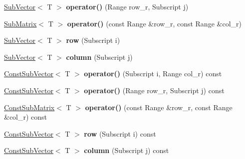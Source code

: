 \begin{DoxyCompactItemize}
\item 
\mbox{\label{classTLAS_1_1Matrix_ab6a9916b81266044063022812ecd8200}} 
\hyperlink{classTLAS_1_1SubVector}{Sub\+Vector}$<$ T $>$ {\bfseries operator()} (Range row\+\_\+r, Subscript j)
\item 
\mbox{\label{classTLAS_1_1Matrix_a30876c6a33cc3f94cf8ea70fa6d68004}} 
\hyperlink{classTLAS_1_1SubMatrix}{Sub\+Matrix}$<$ T $>$ {\bfseries operator()} (const Range \&row\+\_\+r, const Range \&col\+\_\+r)
\item 
\mbox{\label{classTLAS_1_1Matrix_a21a46bf3c6aefeed8a3bb9ffe2dc9c5f}} 
\hyperlink{classTLAS_1_1SubVector}{Sub\+Vector}$<$ T $>$ {\bfseries row} (Subscript i)
\item 
\mbox{\label{classTLAS_1_1Matrix_a65e89469c3bc1229f9923f0adc8e0f53}} 
\hyperlink{classTLAS_1_1SubVector}{Sub\+Vector}$<$ T $>$ {\bfseries column} (Subscript j)
\item 
\mbox{\label{classTLAS_1_1Matrix_a954322b50f072969b6ac63595ea5ca16}} 
\hyperlink{classTLAS_1_1ConstSubVector}{Const\+Sub\+Vector}$<$ T $>$ {\bfseries operator()} (Subscript i, Range col\+\_\+r) const
\item 
\mbox{\label{classTLAS_1_1Matrix_a09ae031976c6e4245c764da84705abda}} 
\hyperlink{classTLAS_1_1ConstSubVector}{Const\+Sub\+Vector}$<$ T $>$ {\bfseries operator()} (Range row\+\_\+r, Subscript j) const
\item 
\mbox{\label{classTLAS_1_1Matrix_a5cc55ffecf08e5d6d77d9672019dd053}} 
\hyperlink{classTLAS_1_1ConstSubMatrix}{Const\+Sub\+Matrix}$<$ T $>$ {\bfseries operator()} (const Range \&row\+\_\+r, const Range \&col\+\_\+r) const
\item 
\mbox{\label{classTLAS_1_1Matrix_a7d8de174547be8f582127b15747a437a}} 
\hyperlink{classTLAS_1_1ConstSubVector}{Const\+Sub\+Vector}$<$ T $>$ {\bfseries row} (Subscript i) const
\item 
\mbox{\label{classTLAS_1_1Matrix_ad2cb3493fc529670ccf3ef430a58a333}} 
\hyperlink{classTLAS_1_1ConstSubVector}{Const\+Sub\+Vector}$<$ T $>$ {\bfseries column} (Subscript j) const

\end{DoxyCompactItemize}
